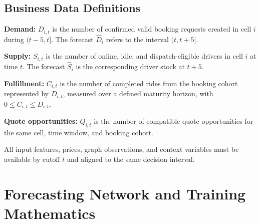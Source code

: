 \documentclass[a4paper,10pt,twocolumn]{article}
\begin{document}
\subsection{Business Data Definitions}
\textbf{Demand:} $D_{i,t}$ is the number of confirmed valid booking requests
created in cell $i$ during $(t-5,t]$. The forecast $\widehat D_i$ refers to
the interval $(t,t+5]$.

\textbf{Supply:} $S_{i,t}$ is the number of online, idle, and
dispatch-eligible drivers in cell $i$ at time $t$. The forecast
$\widehat S_i$ is the corresponding driver stock at $t+5$.

\textbf{Fulfillment:} $C_{i,t}$ is the number of completed rides from the
booking cohort represented by $D_{i,t}$, measured over a defined maturity
horizon, with $0\le C_{i,t}\le D_{i,t}$.

\textbf{Quote opportunities:} $Q_{i,t}$ is the number of compatible quote
opportunities for the same cell, time window, and booking cohort.

All input features, prices, graph observations, and context variables must be
available by cutoff $t$ and aligned to the same decision interval.

\section{Forecasting Network and Training Mathematics}\label{app:gnn}
\end{document}
